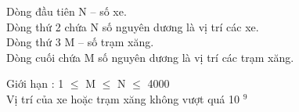 Dòng đầu tiên N – số xe.   
\\   Dòng thứ 2 chứa N số nguyên dương là vị trí các xe.   
\\   Dòng thứ 3 M – số trạm xăng.   
\\   Dòng cuối chứa M số nguyên dương là vị trí các trạm xăng.  

    Giới hạn :      1 $\le$  M  $\le$  N  $\le$  4000   
\\   Vị trí của xe hoặc trạm xăng không vượt quá 10   $^    9   $

\